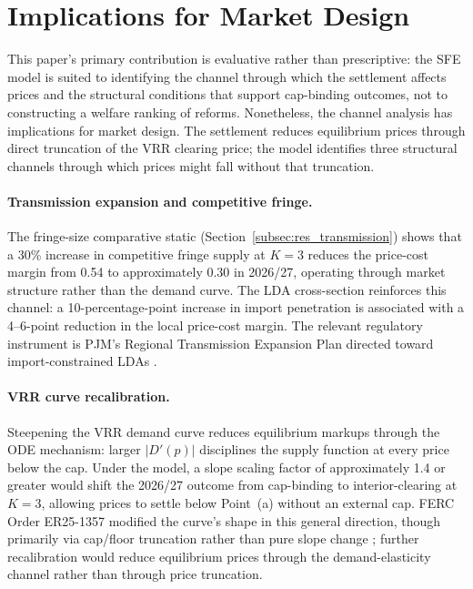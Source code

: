 
\section{Implications for Market Design}
\label{sec:policy_alternatives}

This paper's primary contribution is evaluative rather than prescriptive:
the SFE model is suited to identifying the channel through which the
settlement affects prices and the structural conditions that support
cap-binding outcomes, not to constructing a welfare ranking of reforms.
Nonetheless, the channel analysis has implications for market design. The
settlement reduces equilibrium prices through direct truncation of the VRR
clearing price; the model identifies three structural channels through which
prices might fall without that truncation.

\paragraph{Transmission expansion and competitive fringe.}
The fringe-size comparative static (Section~\ref{subsec:res_transmission}) shows
that a 30\% increase in competitive fringe supply at $K = 3$ reduces the
price-cost margin from 0.54 to approximately 0.30 in 2026/27, operating
through market structure rather than the demand curve. The LDA cross-section
reinforces this channel: a 10-percentage-point increase in import
penetration is associated with a 4--6-point reduction in the local price-cost
margin. The relevant regulatory instrument is PJM's Regional Transmission
Expansion Plan directed toward import-constrained LDAs \citep{PJM_RTEP}.

\paragraph{VRR curve recalibration.}
Steepening the VRR demand curve reduces equilibrium markups through the ODE
mechanism: larger $|D'(p)|$ disciplines the supply function at every price
below the cap. Under the model, a slope scaling factor of approximately 1.4
or greater would shift the 2026/27 outcome from cap-binding to
interior-clearing at $K = 3$, allowing prices to settle below Point~(a)
without an external cap. FERC Order ER25-1357 modified the curve's shape in this general direction,
though primarily via cap/floor truncation rather than pure slope change
\citep{FERC2025_ER25-1357}; further recalibration would reduce equilibrium
prices through the demand-elasticity channel rather than through price
truncation.

